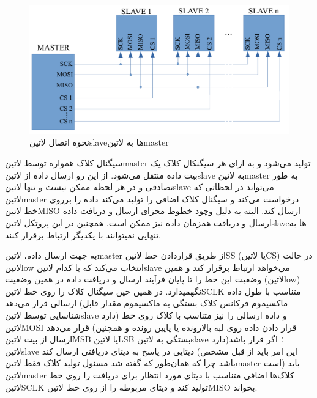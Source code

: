 \begin{figure}[!h]
	\centering
	\includegraphics[width=.7\linewidth]{Assets/SPI.pdf}
	\caption{نحوه اتصال ‌لاتین{slave}ها به ‌لاتین{master}}
	\label{fig:SPIWiring}
\end{figure}

سیگنال کلاک همواره توسط ‌لاتین{master} تولید می‌شود و به ازای هر سیگنکال کلاک یک بیت داده منتقل می‌شود. از این رو ارسال داده از ‌لاتین{slave} به ‌لاتین{master} به طور تصادفی و در هر لحظه ممکن نیست و تنها ‌لاتین{slave} می‌تواند در لحظاتی که ‌لاتین{master} درخواست می‌کند و سیگنال کلاک اضافی را تولید می‌کند داده را برروی خط ‌لاتین{MISO} ارسال کند. البته به دلیل وچود خطوط مجزای ارسال و دریافت داده ارسال و دریافت همزمان داده نیز ممکن است. همچنین در این پروتکل ‌لاتین{slave}ها به تنهایی نمیتوانند با یکدیگر ارتباط برقرار کنند.

به جهت ارسال داده، ‌لاتین{master} از طریق قراردادن خط ‌لاتین{SS} (یا ‌لاتین{CS}) در حالت ‌لاتین{low} انتخاب می‌کند که با کدام ‌لاتین{slave} می‌خواهد ارتباط برقرار کند و همین وضعیت این خط را تا پایان فرآیند ارسال و دریافت داده در همین وضعیت (‌لاتین{low}) نگهمیدارد. در همین حین سیگنال کلاک را روی خط ‌لاتین{SCLK} متناسب با طول داده ارسالی قرار می‌دهد (ماکسیموم فرکانس کلاک بستگی به ماکسیموم مقدار قابل شناسایی توسط ‌لاتین{slave} دارد) و داده ارسالی را نیز متناسب با کلاک روی خط ‌لاتین{MOSI} قرار می‌دهد (قرار دادن داده روی لبه بالارونده یا پایین رونده و همچنین ارسال از بیت ‌لاتین{MSB} یا ‌لاتین{LSB} بستگی به ‌لاتین{slave} دارد)؛ اگر قرار باشد ‌لاتین{slave} دیتایی در پاسخ به دیتای دریافتی ارسال کند (این امر باید از قبل مشخص باشد چرا که همان‌طور که گفته شد مسئول تولید کلاک فقط ‌لاتین{master} است) باید ‌لاتین{master} کلاک‌ها اضافی متناسب با دیتای مورد انتظار برای دریافت را روی خط ‌لاتین{SCLK} تولید کند و دیتای مربوطه را از روی خط ‌لاتین{MISO} بخواند.


